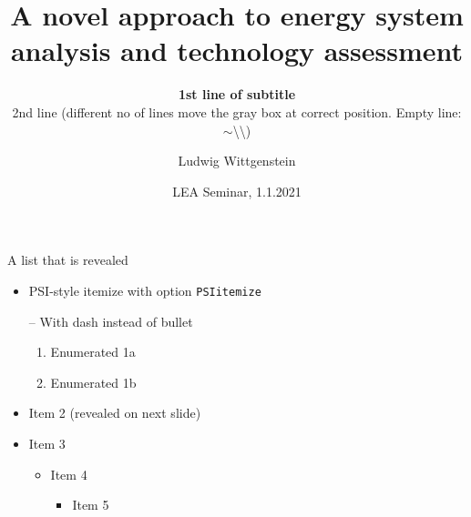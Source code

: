 \documentclass[aspectratio=43]{beamer}
\begin{document}
\title{A novel approach to energy system analysis and technology assessment}

\author[L.~Wittgenstein]{Ludwig Wittgenstein}


\subtitle{\textbf{1st line of subtitle}\\2nd line (different no of lines move the gray box at correct position. Empty line:  $\sim$\textbackslash\textbackslash)}

\date{LEA Seminar, 1.1.2021} %


\begin{frame}[plain] %
  \titlepage
\end{frame}


\begin{frame}[t]{A list that is revealed}
   \PSIvspace
  \begin{itemize}
  \item PSI-style itemize with option \texttt{PSIitemize}
  \item[--]  With dash instead of bullet
    \begin{enumerate}
    \item Enumerated 1a
    \item Enumerated 1b
    \end{enumerate}
    \pause
  \item Item 2 (revealed on next slide)
    \pause
  \item Item 3
    \begin{itemize}
    \item Item 4
      \begin{itemize}
      \item Item 5
      \end{itemize}
    \end{itemize}
  \end{itemize}
\end{frame}
\end{document}
